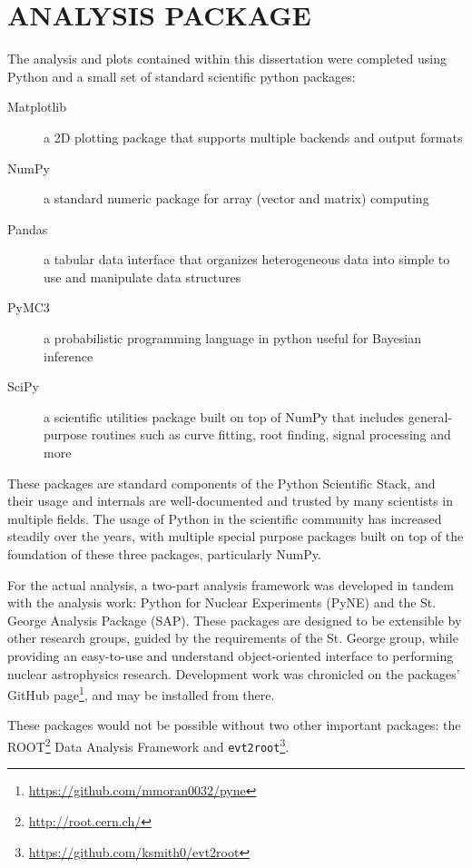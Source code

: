 \chapter{ANALYSIS PACKAGE}
\label{ch:pyne}

The analysis and plots contained within this dissertation were completed
using Python and a small set of standard scientific python packages:


\begin{description}
    \item[Matplotlib] a 2D plotting package that supports multiple
        backends and output formats
    \item[NumPy] a standard numeric package for array (vector and
        matrix) computing
    \item[Pandas] a tabular data interface that organizes heterogeneous
        data into simple to use and manipulate data structures
    \item[PyMC3] a probabilistic programming language in python useful
        for Bayesian inference
    \item[SciPy] a scientific utilities package built on top of NumPy
        that includes general-purpose routines such as curve fitting,
        root finding, signal processing and more
\end{description}

These packages are standard components of the Python Scientific Stack,
and their usage and internals are well-documented and trusted by many
scientists in multiple fields. The usage of Python in the scientific
community has increased steadily over the years, with multiple special
purpose packages built on top of the foundation of these three packages,
particularly NumPy.

For the actual analysis, a two-part analysis framework was developed in
tandem with the analysis work: Python for Nuclear Experiments (PyNE) and
the St. George Analysis Package (SAP). These packages are designed to be
extensible by other research groups, guided by the requirements of the
St. George group, while providing an easy-to-use and understand
object-oriented interface to performing nuclear astrophysics research.
Development work was chronicled on the packages' GitHub
page\footnote{\url{https://github.com/mmoran0032/pyne}}, and may be
installed from there.

These packages would not be possible without two other important
packages: the ROOT\footnote{\url{http://root.cern.ch/}} Data Analysis
Framework\cite{ROOT} and
\texttt{evt2root}\footnote{\url{https://github.com/ksmith0/evt2root}}.


